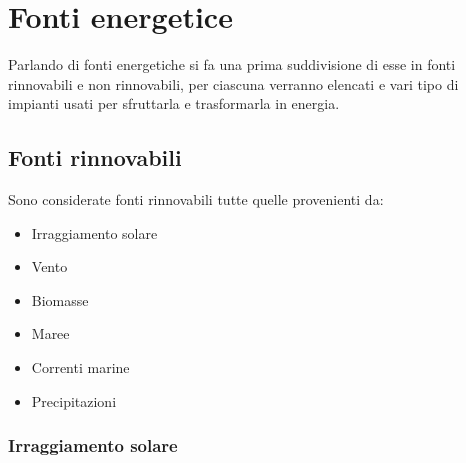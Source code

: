 
\chapter{Fonti energetice}
\label{chp:FontiEnergetiche}
Parlando di fonti energetiche si fa una prima suddivisione di esse in fonti rinnovabili e non rinnovabili, per ciascuna verranno elencati e vari tipo di impianti usati per sfruttarla e trasformarla in energia.

\section{Fonti rinnovabili}
Sono considerate fonti rinnovabili tutte quelle provenienti da:
\begin{itemize}
    \item Irraggiamento solare
    \item Vento
    \item Biomasse
    \item Maree
    \item Correnti marine
    \item Precipitazioni
\end{itemize}
\subsection{Irraggiamento solare}

